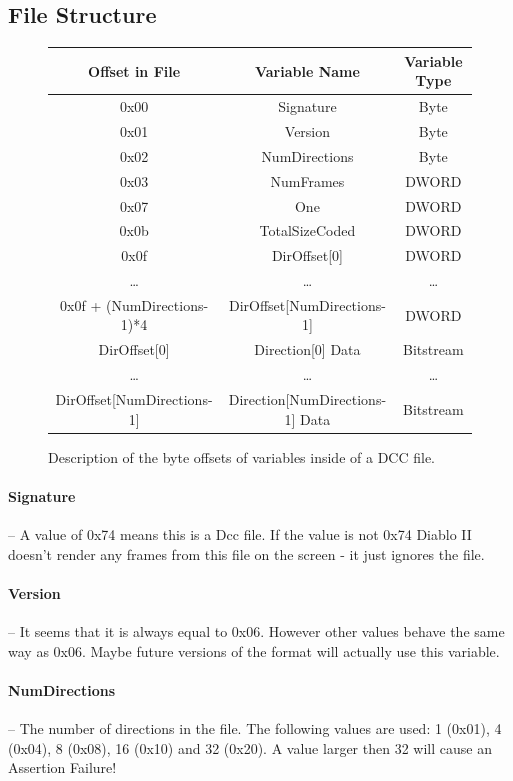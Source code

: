 \subsection{File Structure}
\begin{figure}[h!]
	\caption{Description of the byte offsets of variables inside of a DCC file.}

	\vspace{0.25cm}

	\begin{tabular}{|c|c|c|}
	Offset in File & Variable Name & Variable Type \\
	\hline
	0x00 & Signature & Byte \\
	0x01 & Version & Byte \\
	0x02 & NumDirections & Byte \\
	0x03 & NumFrames & DWORD \\
	0x07 & One & DWORD \\
	0x0b & TotalSizeCoded & DWORD \\
	0x0f & DirOffset[0] & DWORD \\
	\ldots & \ldots & \ldots \\
	0x0f + (NumDirections-1)*4 & DirOffset[NumDirections-1] & DWORD \\
	DirOffset[0] & Direction[0] Data & Bitstream \\
	\ldots & \ldots & \ldots \\
	DirOffset[NumDirections-1] & Direction[NumDirections-1] Data & Bitstream \\
	\end{tabular}

\end{figure}


\paragraph{Signature} -- A value of 0x74 means this is a Dcc file. If the value 
is not 0x74 Diablo II doesn't render any frames from this file on the screen - 
it just ignores the file.	

\paragraph{Version} -- It seems that it is always equal to 0x06. However other 
values behave the same way as 0x06. Maybe future versions of the format will 
actually use this variable.	

\paragraph{NumDirections} -- The number of directions in the file. The following 
values are used: 1 (0x01), 4 (0x04), 8 (0x08), 16 (0x10) and 32 (0x20). A value 
larger then 32 will cause an Assertion Failure!	

